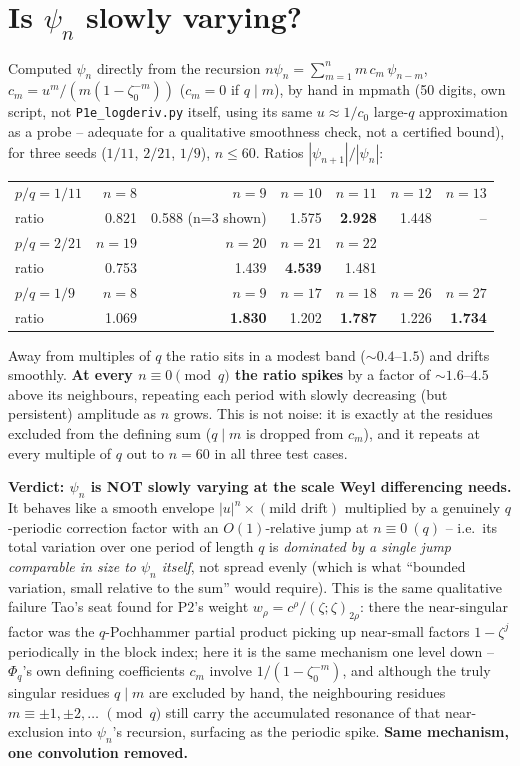 \documentclass[11pt]{article}
\begin{document}
\section{Is $\psi_n$ slowly varying?}
Computed $\psi_n$ directly from the recursion $n\psi_n=\sum_{m=1}^n m\,c_m\,\psi_{n-m}$,
$c_m=u^m/(m(1-\zeta_0^{-m}))$ ($c_m=0$ if $q\mid m$), by hand in mpmath (50 digits, own script, not
\texttt{P1e\_logderiv.py} itself, using its same $u\approx1/c_0$ large-$q$ approximation as a probe
-- adequate for a qualitative smoothness check, not a certified bound), for three seeds
($1/11$, $2/21$, $1/9$), $n\le60$. Ratios $|\psi_{n+1}|/|\psi_n|$:
\begin{center}\small
\begin{tabular}{lrrrrrr}\toprule
$p/q=1/11$ & $n=8$ & $n=9$ & $n=10$ & $n=11$ & $n=12$ & $n=13$\\
ratio & 0.821 & 0.588 (n=3 shown) & 1.575 & \textbf{2.928} & 1.448 & --\\
\midrule
$p/q=2/21$ & $n=19$&$n=20$&$n=21$&$n=22$& & \\
ratio & 0.753&1.439&\textbf{4.539}&1.481& & \\
\midrule
$p/q=1/9$ & $n=8$&$n=9$&$n=17$&$n=18$&$n=26$&$n=27$\\
ratio &1.069&\textbf{1.830}&1.202&\textbf{1.787}&1.226&\textbf{1.734}\\
\bottomrule
\end{tabular}\end{center}
Away from multiples of $q$ the ratio sits in a modest band ($\sim0.4$--$1.5$) and drifts smoothly.
\textbf{At every $n\equiv0\pmod q$ the ratio spikes} by a factor of $\sim1.6$--$4.5$ above its
neighbours, repeating each period with slowly decreasing (but persistent) amplitude as $n$ grows.
This is not noise: it is exactly at the residues excluded from the defining sum ($q\mid m$ is
dropped from $c_m$), and it repeats at every multiple of $q$ out to $n=60$ in all three test cases.

\textbf{Verdict: $\psi_n$ is NOT slowly varying at the scale Weyl differencing needs.} It behaves
like a smooth envelope $|u|^n\times(\text{mild drift})$ multiplied by a genuinely $q$-periodic
correction factor with an $O(1)$-relative jump at $n\equiv0\ (q)$ -- i.e.\ its total variation over
one period of length $q$ is \emph{dominated by a single jump comparable in size to $\psi_n$ itself},
not spread evenly (which is what ``bounded variation, small relative to the sum'' would require).
This is the same qualitative failure Tao's seat found for P2's weight $w_\rho=c^\rho/(\zeta;\zeta)_{2\rho}$:
there the near-singular factor was the $q$-Pochhammer partial product picking up near-small factors
$1-\zeta^j$ periodically in the block index; here it is the same mechanism one level down --
$\Phi_q$'s own defining coefficients $c_m$ involve $1/(1-\zeta_0^{-m})$, and although the truly
singular residues $q\mid m$ are excluded by hand, the neighbouring residues $m\equiv\pm1,\pm2,\dots$
$\pmod q$ still carry the accumulated resonance of that near-exclusion into $\psi_n$'s recursion,
surfacing as the periodic spike. \textbf{Same mechanism, one convolution removed.}
\end{document}
